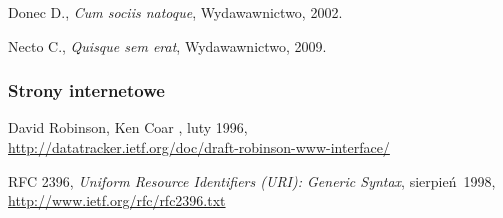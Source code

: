 \clearpage
\begin{thebibliography}{99}

  Donec D., {\em Cum sociis natoque}, Wydawawnictwo,  2002.

  Necto C., {\em Quisque sem erat}, Wydawawnictwo,  2009.

  \subsubsection*{Strony internetowe}

  David Robinson, Ken Coar
  ,
  \newblock luty 1996, \\
  \newblock \url{http://datatracker.ietf.org/doc/draft-robinson-www-interface/}

  RFC 2396, 
  {\em Uniform Resource Identifiers (URI): Generic Syntax},
  \newblock sierpień~1998, \\
  \url{http://www.ietf.org/rfc/rfc2396.txt}


\end{thebibliography}
